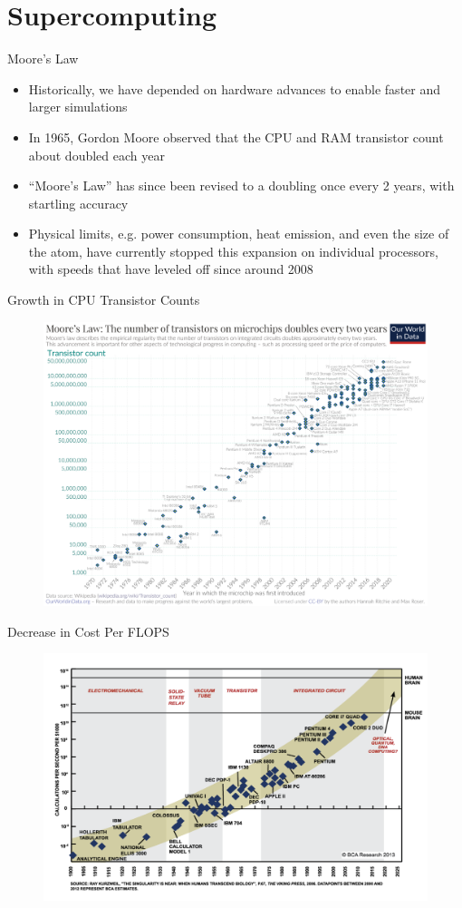 \section{Supercomputing}

\begin{frame}{Moore's Law}
\begin{itemize}
\item Historically, we have depended on hardware advances to enable faster and
      larger simulations
\item In 1965, Gordon Moore observed that the CPU and RAM transistor count
      about doubled each year
\item ``Moore’s Law'' has since been revised to a doubling once every 2 years,
      with startling accuracy
\item Physical limits, e.g. power consumption, heat emission, and even the size
      of the atom, have currently stopped this expansion on individual processors,
      with speeds that have leveled off since around 2008
\end{itemize}
\end{frame}

\begin{frame}{Growth in CPU Transistor Counts}
\begin{figure}
  \centering
  \includegraphics[width=0.65\linewidth]{figures/cpu_transistor_counts.png}
\end{figure}
\end{frame}

\begin{frame}{Decrease in Cost Per FLOPS}
\begin{figure}
  \centering
  \includegraphics[width=0.65\linewidth]{figures/compute_cost.png}
\end{figure}
\end{frame}

